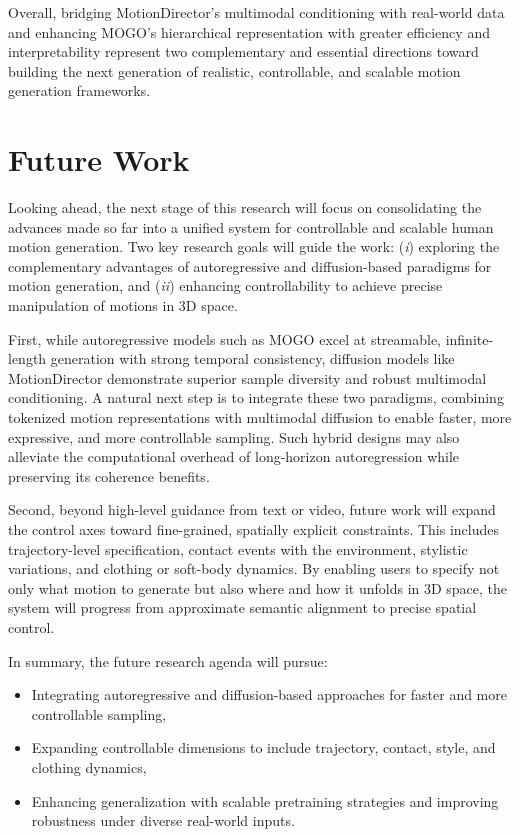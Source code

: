 \documentclass[a4paper,12pt]{article}
\begin{document}
Overall, bridging MotionDirector’s multimodal conditioning with real-world data and enhancing MOGO’s hierarchical representation with greater efficiency and interpretability represent two complementary and essential directions toward building the next generation of realistic, controllable, and scalable motion generation frameworks.






\section{Future Work}
\label{sec:future}

Looking ahead, the next stage of this research will focus on consolidating the advances made so far into a unified system for controllable and scalable human motion generation. Two key research goals will guide the work: (\textit{i}) exploring the complementary advantages of autoregressive and diffusion-based paradigms for motion generation, and (\textit{ii}) enhancing controllability to achieve precise manipulation of motions in 3D space.

First, while autoregressive models such as MOGO excel at streamable, infinite-length generation with strong temporal consistency, diffusion models like MotionDirector demonstrate superior sample diversity and robust multimodal conditioning. A natural next step is to integrate these two paradigms, combining tokenized motion representations with multimodal diffusion to enable faster, more expressive, and more controllable sampling. Such hybrid designs may also alleviate the computational overhead of long-horizon autoregression while preserving its coherence benefits.

Second, beyond high-level guidance from text or video, future work will expand the control axes toward fine-grained, spatially explicit constraints. This includes trajectory-level specification, contact events with the environment, stylistic variations, and clothing or soft-body dynamics. By enabling users to specify not only what motion to generate but also where and how it unfolds in 3D space, the system will progress from approximate semantic alignment to precise spatial control.

In summary, the future research agenda will pursue: 
\begin{itemize}
    \item Integrating autoregressive and diffusion-based approaches for faster and more controllable sampling,
    \item Expanding controllable dimensions to include trajectory, contact, style, and clothing dynamics,
    \item Enhancing generalization with scalable pretraining strategies and improving robustness under diverse real-world inputs.
\end{itemize}
\end{document}
